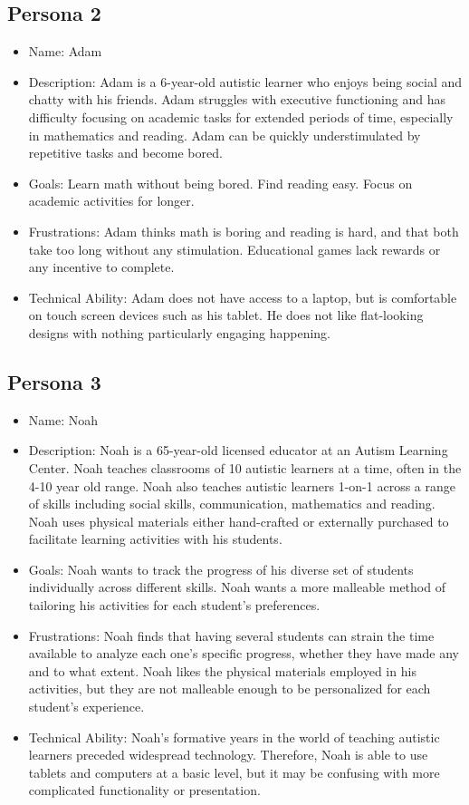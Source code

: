 \documentclass[12pt]{article}
\begin{document}
\subsection{Persona 2}
\begin{itemize}
\item Name: Adam
\item Description: Adam is a 6-year-old autistic learner who enjoys being social and chatty with his friends. Adam struggles with executive functioning and has difficulty focusing on academic tasks for extended periods of time, especially in mathematics and reading. Adam can be quickly understimulated by repetitive tasks and become bored.
\item Goals: Learn math without being bored. Find reading easy. Focus on academic activities for longer. 
\item Frustrations: Adam thinks math is boring and reading is hard, and that both take too long without any stimulation. Educational games lack rewards or any incentive to complete.
\item Technical Ability: Adam does not have access to a laptop, but is comfortable on touch screen devices such as his tablet. He does not like flat-looking designs with nothing particularly engaging happening. 
\end{itemize}
\subsection{Persona 3}
\begin{itemize}
\item Name: Noah
\item Description: Noah is a 65-year-old licensed educator at an Autism Learning Center. Noah teaches classrooms of 10 autistic learners at a time, often in the 4-10 year old range. Noah also teaches autistic learners 1-on-1 across a range of skills including social skills, communication, mathematics and reading. Noah uses physical materials either hand-crafted or externally purchased to facilitate learning activities with his students.
\item Goals: Noah wants to track the progress of his diverse set of students individually across different skills. Noah wants a more malleable method of tailoring his activities for each student's preferences.
\item Frustrations: Noah finds that having several students can strain the time available to analyze each one's specific progress, whether they have made any and to what extent. Noah likes the physical materials employed in his activities, but they are not malleable enough to be personalized for each student's experience.
\item Technical Ability: Noah's formative years in the world of teaching autistic learners preceded widespread technology. Therefore, Noah is able to use tablets and computers at a basic level, but it may be confusing with more complicated functionality or presentation.
\end{itemize}
\end{document}

